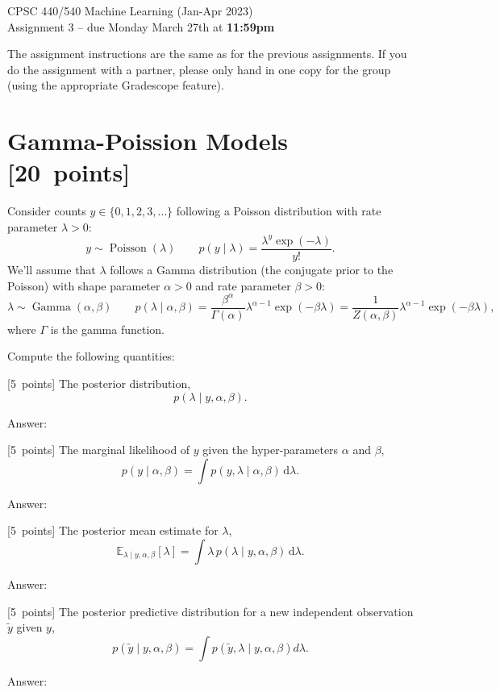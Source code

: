 \documentclass{article}
\newenvironment{answer}{\par\begingroup\color{answer}Answer: }{\endgroup}
\newcommand{\pts}[1]{\textcolor{points}{[#1~points]}}
\newcommand{\TODO}{\color{red}{TODO}}
\newcommand{\ud}{\,\mathrm{d}}
\begin{document}
\begin{center}
\Large
CPSC 440/540 Machine Learning (Jan-Apr 2023)\\
Assignment 3 --
due Monday March 27th at \textbf{11:59pm}
\end{center}


The assignment instructions are the same as for the previous assignments. If you do the assignment with a partner, please only hand in one copy for the group (using the appropriate Gradescope feature).



\section{Gamma-Poission Models \pts{20}}


Consider counts $y \in \{0,1,2,3,\dots\}$ following a Poisson distribution with rate parameter $\lambda > 0$:
\[
y \sim \operatorname{Poisson}(\lambda)
\qquad
p(y \mid \lambda) = \frac{\lambda^y\exp(-\lambda)}{y!}.
\]
We'll assume that $\lambda$ follows a Gamma distribution (the conjugate prior to the Poisson) with shape parameter $\alpha > 0$ and rate parameter $\beta > 0$:
\[
\lambda \sim \operatorname{Gamma}(\alpha, \beta)
\qquad
p(\lambda \mid \alpha, \beta)
  = \frac{\beta^\alpha}{\Gamma(\alpha)} \lambda^{\alpha-1}\exp(-\beta\lambda)
  = \frac{1}{Z(\alpha, \beta)} \lambda^{\alpha-1}\exp(-\beta\lambda)
,\]
where $\Gamma$ is the gamma function.

Compute the following quantities:

\begin{qlist} \color{question}

\item \pts{5} The posterior distribution, \[ p(\lambda \mid y,\alpha, \beta).  \]

\begin{answer}\TODO\end{answer}

\item \pts{5} The marginal likelihood of $y$ given the hyper-parameters $\alpha$ and $\beta$,
\[ p(y\mid \alpha, \beta) = \int p(y,\lambda\mid \alpha, \beta) \ud\lambda.  \]

\begin{answer}\TODO\end{answer}

\item \pts{5} The posterior mean estimate for $\lambda$,
\[ \mathbb{E}_{\lambda\mid y,\alpha,\beta}[\lambda] = \int \lambda \, p(\lambda \mid y,\alpha,\beta) \ud\lambda.  \]

\begin{answer}\TODO\end{answer}


\item \pts{5} The posterior predictive distribution for a new independent observation $\tilde{y}$ given $y$,
\[ p(\tilde{y}\mid y,\alpha,\beta) =  \int p(\tilde{y},\lambda\mid y,\alpha,\beta)d\lambda.  \]


\begin{answer}\TODO\end{answer}

\end{qlist}
\end{document}

